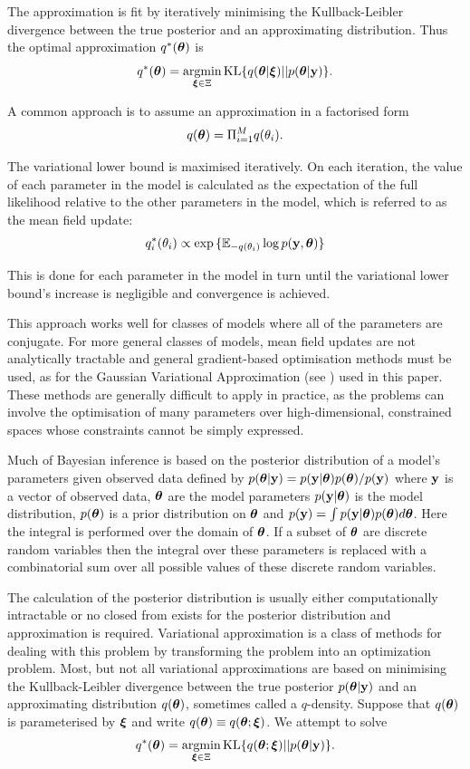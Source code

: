 \documentclass{amsart}[12pt]
\begin{document}
\noindent The approximation is fit by iteratively minimising the Kullback-Leibler divergence between the true
posterior and an approximating distribution. Thus the optimal approximation $q^*({\boldsymbol \theta})$ is
$$
q^*(\vtheta) = \argmin_{\vxi \in \Xi} \text{KL} \{ {q(\vtheta|\vxi) || p(\vtheta|\vy)} \}.
$$

\noindent A common approach is to assume an approximation in a factorised form
$$q({\boldsymbol \theta}) = \Pi_{i=1}^M q(\theta_i).$$

\noindent The variational lower bound is maximised iteratively. On each iteration, the value of each parameter
in the model is calculated as the expectation of the full likelihood relative to the other parameters in the
model, which is referred to as the mean field update:
$$q_i^*(\theta_i) \propto \exp{\{ {\mathbb E}_{-q(\theta_i)} \log p({\bf y}, {\boldsymbol\theta}) \}}$$

\noindent This is done for each parameter in the model in turn until the variational lower bound's increase is
negligible and convergence is achieved.

This approach works well for classes of models where all of the parameters are conjugate. For more
general classes of models, mean field updates are not analytically tractable and general gradient-based
optimisation methods must be used, as for the Gaussian Variational Approximation (see \citep{ormerod09}) used
in this paper. These methods are generally difficult to apply in practice, as the problems can involve the
optimisation of many parameters over high-dimensional, constrained spaces whose constraints cannot be simply
expressed.

Much of Bayesian inference is based on the posterior distribution of a model's parameters given observed data 
defined by $p({\boldsymbol \theta}|{\bf y}) = p({\bf y}|{\boldsymbol \theta})p({\boldsymbol \theta})/p({\bf y})$ where ${\bf y}$ is a vector of observed data,
${\boldsymbol \theta}$ are the model parameters $p({\bf y}|{\boldsymbol \theta})$ is the model distribution, $p({\boldsymbol \theta})$ is a prior 
distribution on ${\boldsymbol \theta}$ and $p({\bf y})=\int p({\bf y}|{\boldsymbol \theta})p({\boldsymbol \theta})d{\boldsymbol \theta}$. Here the integral is performed
over the domain of ${\boldsymbol \theta}$. If a subset of ${\boldsymbol \theta}$ are discrete random variables then the integral over
these parameters is replaced with a combinatorial sum over all possible values of these discrete random 
variables.

\noindent The calculation of the posterior distribution is usually either computationally intractable or no
closed from exists for the posterior distribution and approximation is required. Variational approximation is
a  class of methods for dealing with this problem by transforming the problem into an optimization problem.
Most, but not all variational approximations are based on minimising the Kullback-Leibler divergence between
the true posterior $p({\boldsymbol \theta}|{\bf y})$ and an approximating distribution $q({\boldsymbol \theta})$, sometimes called a
$q$-density. Suppose that $q({\boldsymbol \theta})$ is parameterised by ${\boldsymbol \xi}$ and write $q({\boldsymbol \theta})\equiv
q({\boldsymbol \theta};{\boldsymbol \xi})$. We attempt to solve
$$
\ds q^*(\vtheta) = \argmin_{\vxi \in \Xi} \text{KL} \{ {q(\vtheta;\vxi) || p(\vtheta|\vy)} \}.
$$
\end{document}
